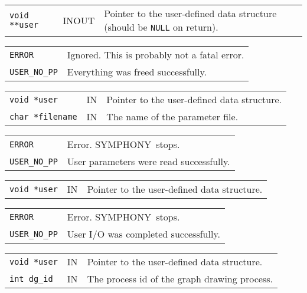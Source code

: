 \documentclass[twoside,11pt]{article}
\begin{document}
{\newpage
\clearpage
\samepage \begin{tabular}{llp{317.395pt}}
{\tt void **user} & INOUT & Pointer to the user-defined data structure
(should be {\tt NULL} on return). \\ 
\end{tabular}
}

{\newpage
\clearpage
\samepage \begin{tabular}{lp{371.195pt}}
{\tt ERROR} & Ignored. This is probably not a fatal error.\\ 
{\tt USER\_NO\_PP} & Everything was freed successfully. \\ 
\end{tabular}
}

{\newpage
\clearpage
\samepage \begin{tabular}{llp{301.645pt}}
{\tt void *user} & IN & Pointer to the user-defined data structure. \\ 
{\tt char *filename} & IN & The name of the parameter file. \\ 
\end{tabular}
}

{\newpage
\clearpage
\samepage \begin{tabular}{lp{371.195pt}}
{\tt ERROR} & Error. {\sc SYMPHONY}\ stops. \\ 
{\tt USER\_NO\_PP} & User parameters were read successfully. \\ 
\end{tabular}
}

{\newpage
\clearpage
\samepage \begin{tabular}{llp{322.645pt}}
{\tt void *user} & IN & Pointer to the user-defined data structure. \\ 
\end{tabular}
}

{\newpage
\clearpage
\samepage \begin{tabular}{lp{371.195pt}}
{\tt ERROR} & Error. {\sc SYMPHONY}\ stops. \\ 
{\tt USER\_NO\_PP} & User I/O was completed successfully. \\ 
\end{tabular}
}

{\newpage
\clearpage
\samepage \begin{tabular}{llp{322.645pt}}
{\tt void *user} & IN & Pointer to the user-defined data structure. \\ 
{\tt int dg\_id} & IN & The process id of the graph drawing process. \\ 
\end{tabular}
}
\end{document}
